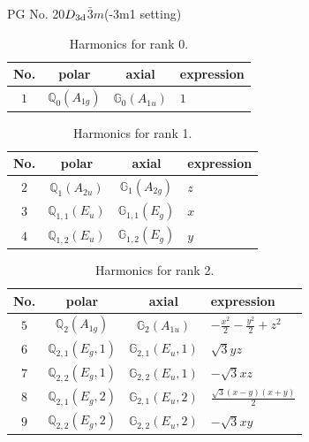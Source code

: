 \documentclass[fleqn,8pt,landscape]{jsarticle}
\begin{document}
\setcounter{MaxMatrixCols}{32}

\renewcommand{\tablename}{Table~}
\renewcommand{\figurename}{Figure~}
\begin{center}
\LARGE
PG No. 20\quad$D_{\rm 3d}$\quad$\bar{3}m$\quad(-3m1 setting)\quad[ trigonal ]
\end{center}
\begin{table}[ht!]
\begin{center}
\caption{Harmonics for rank 0.}
\renewcommand{\arraystretch}{1.3}
\begin{tabular}{cccl} \hline \hline
No. & polar & axial & expression \\ \hline
$ 1 $ & $ \mathbb{Q}_{0}(A_{1g}) $ & $ \mathbb{G}_{0}(A_{1u}) $ & $ 1 $ \\
 \hline \hline
\end{tabular}
\end{center}
\end{table}
\begin{table}[ht!]
\begin{center}
\caption{Harmonics for rank 1.}
\renewcommand{\arraystretch}{1.3}
\begin{tabular}{cccl} \hline \hline
No. & polar & axial & expression \\ \hline
$ 2 $ & $ \mathbb{Q}_{1}(A_{2u}) $ & $ \mathbb{G}_{1}(A_{2g}) $ & $ z $ \\
$ 3 $ & $ \mathbb{Q}_{1,1}(E_{u}) $ & $ \mathbb{G}_{1,1}(E_{g}) $ & $ x $ \\
$ 4 $ & $ \mathbb{Q}_{1,2}(E_{u}) $ & $ \mathbb{G}_{1,2}(E_{g}) $ & $ y $ \\
 \hline \hline
\end{tabular}
\end{center}
\end{table}
\begin{table}[ht!]
\begin{center}
\caption{Harmonics for rank 2.}
\renewcommand{\arraystretch}{1.3}
\begin{tabular}{cccl} \hline \hline
No. & polar & axial & expression \\ \hline
$ 5 $ & $ \mathbb{Q}_{2}(A_{1g}) $ & $ \mathbb{G}_{2}(A_{1u}) $ & $ - \frac{x^{2}}{2} - \frac{y^{2}}{2} + z^{2} $ \\
$ 6 $ & $ \mathbb{Q}_{2,1}(E_{g},1) $ & $ \mathbb{G}_{2,1}(E_{u},1) $ & $ \sqrt{3} y z $ \\
$ 7 $ & $ \mathbb{Q}_{2,2}(E_{g},1) $ & $ \mathbb{G}_{2,2}(E_{u},1) $ & $ - \sqrt{3} x z $ \\
$ 8 $ & $ \mathbb{Q}_{2,1}(E_{g},2) $ & $ \mathbb{G}_{2,1}(E_{u},2) $ & $ \frac{\sqrt{3} \left(x - y\right) \left(x + y\right)}{2} $ \\
$ 9 $ & $ \mathbb{Q}_{2,2}(E_{g},2) $ & $ \mathbb{G}_{2,2}(E_{u},2) $ & $ - \sqrt{3} x y $ \\
 \hline \hline
\end{tabular}
\end{center}
\end{table}
\end{document}
